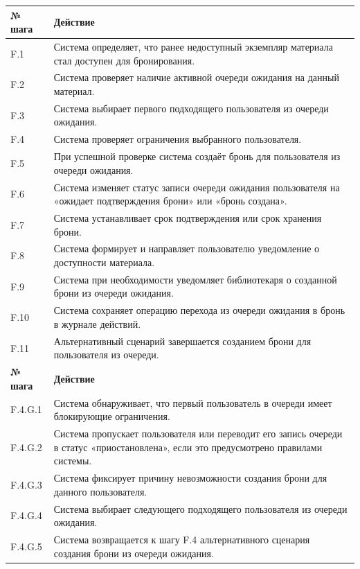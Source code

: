 \documentclass[12pt,a4paper]{article}
\begin{document}
\begin{xltabular}{\textwidth}{
				|>{\raggedright\arraybackslash}p{2.7cm}
				|>{\raggedright\arraybackslash}X|
			}
			\textbf{№ шага} & \textbf{Действие} \\
			\hline
			
			F.1 & Система определяет, что ранее недоступный экземпляр материала стал
			доступен для бронирования. \\
			\hline
			F.2 & Система проверяет наличие активной очереди ожидания на данный
			материал. \\
			\hline
			F.3 & Система выбирает первого подходящего пользователя из очереди
			ожидания. \\
			\hline
			F.4 & Система проверяет ограничения выбранного пользователя. \\
			\hline
			F.5 & При успешной проверке система создаёт бронь для пользователя из
			очереди ожидания. \\
			\hline
			F.6 & Система изменяет статус записи очереди ожидания пользователя на
			«ожидает подтверждения брони» или «бронь создана». \\
			\hline
			F.7 & Система устанавливает срок подтверждения или срок хранения брони. \\
			\hline
			F.8 & Система формирует и направляет пользователю уведомление о
			доступности материала. \\
			\hline
			F.9 & Система при необходимости уведомляет библиотекаря о созданной
			брони из очереди ожидания. \\
			\hline
			F.10 & Система сохраняет операцию перехода из очереди ожидания в бронь
			в журнале действий. \\
			\hline
			F.11 & Альтернативный сценарий завершается созданием брони для
			пользователя из очереди. \\
			\hline
			
			
			\textbf{№ шага} & \textbf{Действие} \\
			\hline
			
			F.4.G.1 & Система обнаруживает, что первый пользователь в очереди имеет
			блокирующие ограничения. \\
			\hline
			F.4.G.2 & Система пропускает пользователя или переводит его запись очереди
			в статус «приостановлена», если это предусмотрено правилами системы. \\
			\hline
			F.4.G.3 & Система фиксирует причину невозможности создания брони для
			данного пользователя. \\
			\hline
			F.4.G.4 & Система выбирает следующего подходящего пользователя из очереди
			ожидания. \\
			\hline
			F.4.G.5 & Система возвращается к шагу F.4 альтернативного сценария создания
			брони из очереди ожидания. \\
			\hline
			

\end{xltabular}
\end{document}
